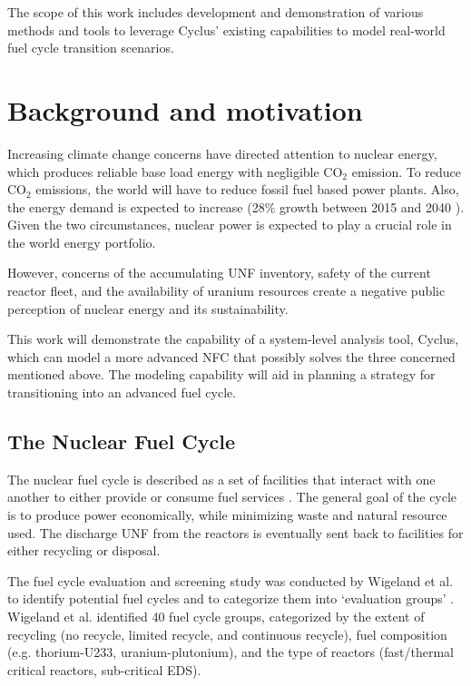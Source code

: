 The scope of this work includes development and demonstration of
various methods and tools to leverage Cyclus' existing
capabilities to model real-world fuel cycle transition scenarios.

\section{Background and motivation}
Increasing climate change concerns have directed attention
to nuclear energy, which produces reliable base load energy
with negligible CO$_2$ emission. To reduce CO$_2$ emissions,
the world will have to reduce fossil fuel based power plants.
Also, the energy demand is expected to increase
(28\% growth between 2015 and 2040 \cite{conti_international_2016}).
Given the two circumstances,
nuclear power is expected to play a crucial role in the world energy portfolio.

However, concerns of the accumulating \gls{UNF} inventory,
safety of the current reactor fleet, and the availability of
uranium resources create a negative public perception of
nuclear energy and its sustainability.

This work will demonstrate the capability of a system-level
analysis tool, Cyclus, which can model a more advanced \gls{NFC} that
possibly solves the three concerned mentioned above. 
The modeling capability will aid in planning a strategy for
transitioning into an advanced fuel cycle.

\subsection{The Nuclear Fuel Cycle}
The nuclear fuel cycle is described as a set of facilities
that interact with one another to either provide or consume
fuel services \cite{gidden_agent-based_2015}. The general goal of
the cycle is to produce power economically, while minimizing
waste and natural resource used. The discharge
\gls{UNF} from the reactors is eventually sent back to facilities for
either recycling or disposal.

The fuel cycle evaluation and screening study was
conducted by Wigeland et al. to identify potential
fuel cycles and to categorize them into `evaluation groups' \cite{wigeland_nuclear_2014}.
Wigeland et al. identified 40 fuel cycle groups, categorized by the extent of recycling
(no recycle, limited recycle, and continuous recycle), fuel composition
(e.g. thorium-U233, uranium-plutonium), and the type of reactors (fast/thermal critical
reactors, sub-critical \gls{EDS}).


